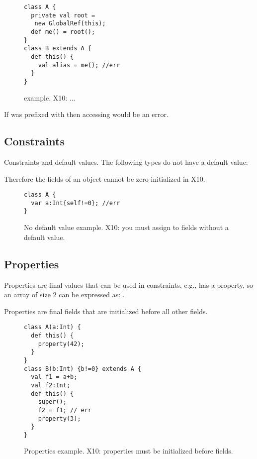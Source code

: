 \begin{figure}
\begin{lstlisting}
class A {
  private val root =
   new GlobalRef(this);
  def me() = root();
}
class B extends A {
  def this() {
    val alias = me(); //err
  }
}
\end{lstlisting}
\caption{ example.
    X10: ...}
\label{Figure:GlobalRef}
\end{figure}

If  was prefixed with
then accessing  would be an error.

\subsection{Constraints}
Constraints and default values.
The following types do not have a default value:

Therefore the fields of an object cannot be zero-initialized in X10.

\begin{figure}
\begin{lstlisting}
class A {
  var a:Int{self!=0}; //err
}
\end{lstlisting}
\caption{No default value example.
    X10: you must assign to  fields without a default value.}
\label{Figure:Constraints}
\end{figure}


\subsection{Properties}
Properties are final values that can be used in constraints,
    e.g.,  has a  property,
    so an array of size 2 can be expressed as: .

Properties are final fields that are initialized before all other fields.


\begin{figure}
\begin{lstlisting}
class A(a:Int) {
  def this() {
    property(42);
  }
}
class B(b:Int) {b!=0} extends A {
  val f1 = a+b;
  val f2:Int;
  def this() {
    super();
    f2 = f1; // err
    property(3);
  }
}
\end{lstlisting}
\caption{Properties example.
    X10: properties must be initialized before fields.}
\label{Figure:Properties}
\end{figure}


